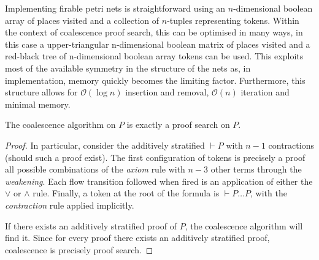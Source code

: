     \begin{example}
    \end{example}
    
    \begin{remark}
        Implementing firable petri nets is straightforward using an $n$-dimensional boolean array of places visited and a collection of $n$-tuples representing tokens.
        Within the context of coalescence proof search, this can be optimised in many ways, in this case a upper-triangular n-dimensional boolean matrix of places visited and a red-black tree of n-dimensional boolean array tokens can be used.
        This exploits most of the available symmetry in the structure of the nets as, in implementation, memory quickly becomes the limiting factor.
        Furthermore, this structure allows for $\mathcal{O}(\log{}n)$ insertion and removal, $\mathcal{O}(n)$ iteration and minimal memory.
    \end{remark}


    \begin{proposition}
        The coalescence algorithm on $P$ is exactly a proof search on $P$.
    \end{proposition}

    \begin{proof}
        In particular, consider the additively stratified $\vdash P$ with $n - 1$ contractions (should such a proof exist).
        The first configuration of tokens is precisely a proof all possible combinations of the \textit{axiom} rule with $n - 3$ other terms through the \textit{weakening}.
        Each flow transition followed when fired is an application of either the $\vee$ or $\wedge$ rule.
        Finally, a token at the root of the formula is $\vdash P \ldots P$, with the \textit{contraction} rule applied implicitly.

        If there exists an additively stratified proof of $P$, the coalescence algorithm will find it.
        Since for every proof there exists an additively stratified proof, coalescence is precisely proof search.
    \end{proof}

